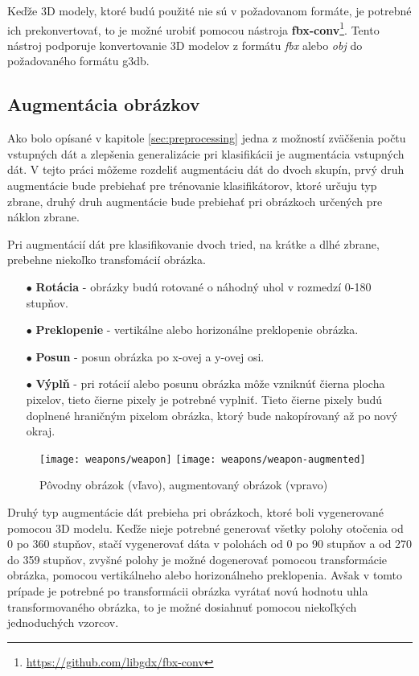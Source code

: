 Keďže 3D modely, ktoré budú použité nie sú v požadovanom formáte, je potrebné ich prekonvertovať, to je možné urobiť
    pomocou nástroja \textbf{fbx-conv}\footnote{\url{https://github.com/libgdx/fbx-conv}}.
Tento nástroj podporuje konvertovanie 3D modelov z formátu \textit{fbx} alebo \textit{obj} do požadovaného formátu g3db.

\subsection{Augmentácia obrázkov}
\label{subsec:augmentacia}
Ako bolo opísané v kapitole \ref{sec:preprocessing} jedna z možností zväčšenia počtu vstupných dát a zlepšenia generalizácie pri klasifikácii je augmentácia vstupných dát.
V tejto práci môžeme rozdeliť augmentáciu dát do dvoch skupín, prvý druh augmentácie bude prebiehať pre trénovanie klasifikátorov, ktoré
    určuju typ zbrane, druhý druh augmentácie bude prebiehať pri obrázkoch určených pre náklon zbrane.

Pri augmentácií dát pre klasifikovanie dvoch tried, na krátke a dlhé zbrane, prebehne niekoľko transfomácií obrázka.
\begin{enumerate}
    \item[$\bullet$] \textbf{Rotácia} - obrázky budú rotované o náhodný uhol v rozmedzí 0-180 stupňov.
    \item[$\bullet$] \textbf{Preklopenie} - vertikálne alebo horizonálne preklopenie obrázka.
    \item[$\bullet$] \textbf{Posun} - posun obrázka po x-ovej a y-ovej osi.
    \item[$\bullet$] \textbf{Výplň} - pri rotácií alebo posunu obrázka môže vzniknúť čierna plocha pixelov, tieto čierne pixely je potrebné vyplniť.
    Tieto čierne pixely budú doplnené hraničným pixelom obrázka, ktorý bude nakopírovaný až po nový okraj.
\end{enumerate}

\begin{figure}[H]
    \centering
    \texttt{[image: weapons/weapon]}
    \qquad
    \texttt{[image: weapons/weapon-augmented]}
    \caption{Pôvodny obrázok (vľavo), augmentovaný obrázok (vpravo)}
    \label{pic:imageAugmented}
\end{figure}

Druhý typ augmentácie dát prebieha pri obrázkoch, ktoré boli vygenerované pomocou 3D modelu.
Keďže nieje potrebné generovať všetky polohy otočenia od 0 po 360 stupňov, stačí vygenerovať dáta v polohách od 0 po 90 stupňov a od 270 do 359 stupňov,
    zvyšné polohy je možné dogenerovať pomocou transformácie obrázka, pomocou vertikálneho alebo horizonálneho preklopenia.
Avšak v tomto prípade je potrebné po transformácii obrázka vyrátať novú hodnotu uhla transformovaného obrázka, to je možné dosiahnuť pomocou niekoľkých
    jednoduchých vzorcov.

